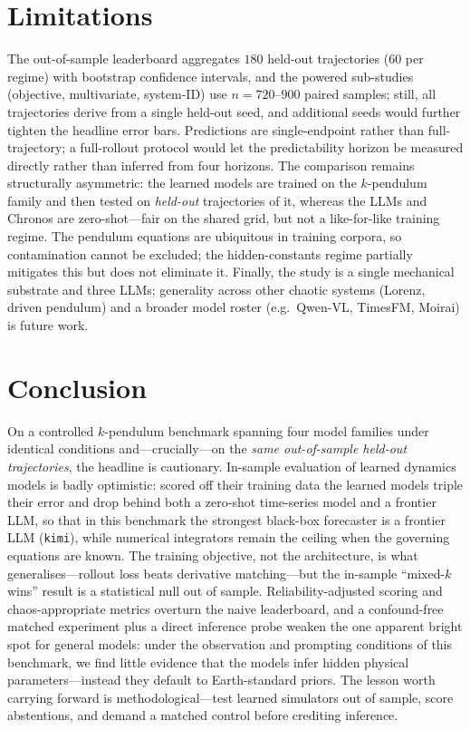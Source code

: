 \documentclass{article}
\begin{document}
\section{Limitations}
The out-of-sample leaderboard aggregates $180$ held-out trajectories ($60$ per regime)
with bootstrap confidence intervals, and the powered sub-studies (objective,
multivariate, system-ID) use $n{=}720$--$900$ paired samples; still, all trajectories
derive from a single held-out seed, and additional seeds would further tighten the
headline error bars. Predictions
are single-endpoint rather than full-trajectory; a full-rollout protocol would let the
predictability horizon be measured directly rather than inferred from four horizons.
The comparison remains structurally asymmetric: the learned models are trained on the
$k$-pendulum family and then tested on \emph{held-out} trajectories of it, whereas the
LLMs and Chronos are zero-shot---fair on the shared grid, but not a like-for-like
training regime. The pendulum equations are ubiquitous in training corpora, so
contamination cannot be excluded; the hidden-constants regime partially mitigates this
but does not eliminate it. Finally, the study is a single mechanical substrate and
three LLMs; generality across other chaotic systems (Lorenz, driven pendulum) and a
broader model roster (e.g.\ Qwen-VL, TimesFM, Moirai) is future work.

\section{Conclusion}
On a controlled $k$-pendulum benchmark spanning four model families under identical
conditions and---crucially---on the \emph{same out-of-sample held-out trajectories},
the headline is cautionary. In-sample evaluation of learned dynamics models is badly
optimistic: scored off their training data the learned models triple their error and
drop behind both a zero-shot time-series model and a frontier LLM, so that in this
benchmark the strongest black-box forecaster is a frontier LLM (\texttt{kimi}), while
numerical integrators remain the ceiling when the governing equations are known. The training objective, not the architecture, is what generalises---rollout
loss beats derivative matching---but the in-sample ``mixed-$k$ wins'' result is a
statistical null out of sample. Reliability-adjusted scoring and chaos-appropriate
metrics overturn the naive leaderboard, and a confound-free matched experiment plus a
direct inference probe weaken the one apparent bright spot for general models: under the observation and
prompting conditions of this benchmark, we find little evidence that the models infer
hidden physical parameters---instead they default to Earth-standard priors. The lesson worth carrying forward is
methodological---test learned simulators out of sample, score abstentions, and demand a
matched control before crediting inference.
\end{document}
